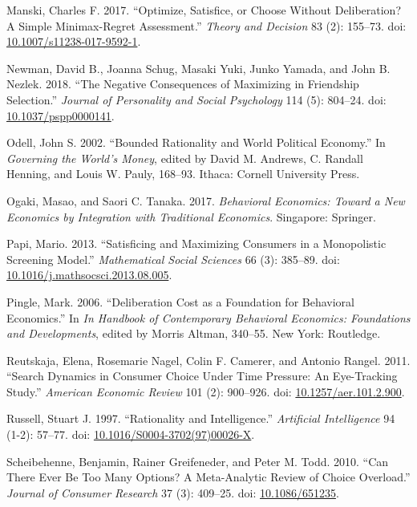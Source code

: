\documentclass[
  10pt,
  letterpaper,
  DIV=11,
  numbers=noendperiod,
  twoside]{scrartcl}
\newlength{\cslhangindent}
\newenvironment{CSLReferences}[2] %
 {\begin{list}{}{%
  \setlength{\itemindent}{0pt}
  \setlength{\leftmargin}{0pt}
  \setlength{\parsep}{0pt}
  \ifodd #1
   \setlength{\leftmargin}{\cslhangindent}
   \setlength{\itemindent}{-1\cslhangindent}
  \fi
  \setlength{\itemsep}{#2\baselineskip}}}
 {\end{list}}
\begin{document}
\begin{CSLReferences}{1}{0}
Manski, Charles F. 2017. {``Optimize, Satisfice, or Choose Without
Deliberation? A Simple Minimax-Regret Assessment.''} \emph{Theory and
Decision} 83 (2): 155--73. doi:
\href{https://doi.org/10.1007/s11238-017-9592-1}{10.1007/s11238-017-9592-1}.

Newman, David B., Joanna Schug, Masaki Yuki, Junko Yamada, and John B.
Nezlek. 2018. {``The Negative Consequences of Maximizing in Friendship
Selection.''} \emph{Journal of Personality and Social Psychology} 114
(5): 804--24. doi:
\href{https://doi.org/10.1037/pspp0000141}{10.1037/pspp0000141}.

Odell, John S. 2002. {``Bounded Rationality and World Political
Economy.''} In \emph{Governing the World's Money}, edited by David M.
Andrews, C. Randall Henning, and Louis W. Pauly, 168--93. Ithaca:
Cornell University Press.

Ogaki, Masao, and Saori C. Tanaka. 2017. \emph{Behavioral Economics:
Toward a New Economics by Integration with Traditional Economics}.
Singapore: Springer.

Papi, Mario. 2013. {``Satisficing and Maximizing Consumers in a
Monopolistic Screening Model.''} \emph{Mathematical Social Sciences} 66
(3): 385--89. doi:
\href{https://doi.org/10.1016/j.mathsocsci.2013.08.005}{10.1016/j.mathsocsci.2013.08.005}.

Pingle, Mark. 2006. {``Deliberation Cost as a Foundation for Behavioral
Economics.''} In \emph{In Handbook of Contemporary Behavioral Economics:
Foundations and Developments}, edited by Morris Altman, 340--55. New
York: Routledge.

Reutskaja, Elena, Rosemarie Nagel, Colin F. Camerer, and Antonio Rangel.
2011. {``Search Dynamics in Consumer Choice Under Time Pressure: An
Eye-Tracking Study.''} \emph{American Economic Review} 101 (2):
900--926. doi:
\href{https://doi.org/10.1257/aer.101.2.900}{10.1257/aer.101.2.900}.

Russell, Stuart J. 1997. {``Rationality and Intelligence.''}
\emph{Artificial Intelligence} 94 (1-2): 57--77. doi:
\href{https://doi.org/10.1016/S0004-3702(97)00026-X}{10.1016/S0004-3702(97)00026-X}.

Scheibehenne, Benjamin, Rainer Greifeneder, and Peter M. Todd. 2010.
{``Can There Ever Be Too Many Options? A Meta-Analytic Review of Choice
Overload.''} \emph{Journal of Consumer Research} 37 (3): 409--25. doi:
\href{https://doi.org/10.1086/651235}{10.1086/651235}.


\end{CSLReferences}
\end{document}
